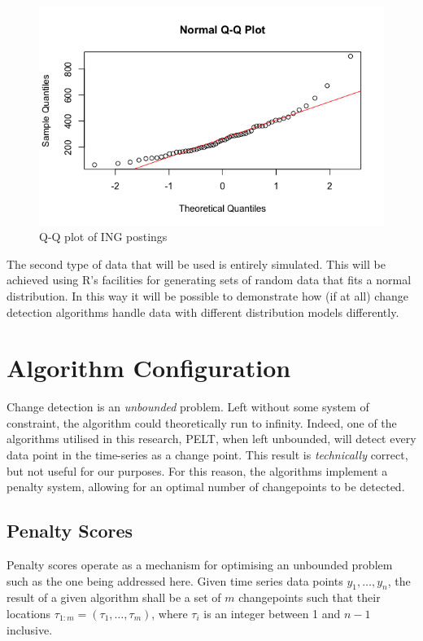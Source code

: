 \documentclass{uvamscse}	%
\begin{document}
\begin{figure}[hbt]
	\includegraphics[scale=0.5]{figures/qqplot-ing.png}
	\centering
	\caption{Q-Q plot of ING postings}
	\label{fig:ing_QQ_plot}
\end{figure}

The second type of data that will be used is entirely simulated. This will be achieved using R's facilities for generating sets of random data that fits a normal distribution. In this way it will be possible to demonstrate how (if at all) change detection algorithms handle data with different distribution models differently.

\section{Algorithm Configuration}

Change detection is an \emph{unbounded} problem. Left without some system of constraint, the algorithm could theoretically run to infinity. Indeed, one of the algorithms utilised in this research, PELT, when left unbounded, will detect every data point in the time-series as a change point. This result is \textit{technically} correct, but not useful for our purposes. For this reason, the algorithms implement a penalty system, allowing for an optimal number of changepoints to be detected.

\subsection{Penalty Scores}

Penalty scores operate as a mechanism for optimising an unbounded problem such as the one being addressed here. Given time series data points $y_1,\ldots,y_n$, the result of a given algorithm shall be a set of $m$ changepoints such that their locations $\tau_{1:m} = (\tau_1,\ldots,\tau_m)$, where $\tau_i$ is an integer between 1 and $n-1$ inclusive.
\end{document}
